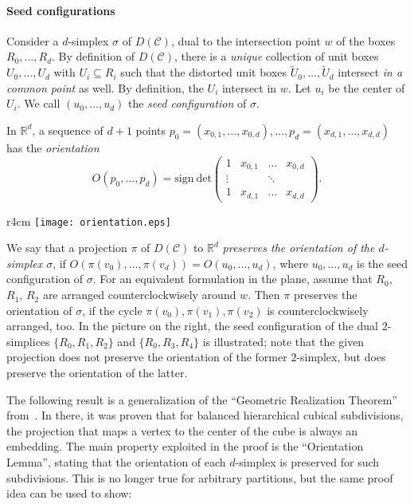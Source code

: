\documentclass[12pt]{article}
\newcommand{\R}{\mathbb{R}}
\newcommand{\orient}{O}
\newcommand{\partition}{\mathcal{C}}
\begin{document}
\paragraph{Seed configurations}
Consider a $d$-simplex $\sigma$ of $D(\partition)$, dual to the intersection point $w$
of the boxes $R_0,\ldots,R_d$.
By definition of $D(\partition)$, there is a \emph{unique} collection of unit boxes
$U_0,\ldots,U_d$ with $U_i\subseteq R_i$ such that the distorted
unit boxes $\tilde{U}_0,\ldots,\tilde{U}_d$ intersect \emph{in a common point} as well.
By definition, the $U_i$ intersect in $w$.
Let $u_i$ be the center of $U_i$. We call $(u_0,\ldots,u_d)$
the \emph{seed configuration} of $\sigma$.

In $\R^d$, a sequence of $d+1$ points
$p_0=(x_{0,1},\ldots,x_{0,d}),\ldots,p_d=(x_{d,1},\ldots,x_{d,d})$ 
has the \emph{orientation} 
\[
\orient(p_0,\ldots,p_d)=\mathrm{sign}\ \mathrm{det}
\left(
\begin{array}{cccc}
1 & x_{0,1} & \ldots & x_{0,d}\\
\vdots & & \ddots & \\
1 & x_{d,1} & \ldots & x_{d,d}
\end{array}
\right).
\]
\begin{wrapfigure}[10]{r}{4cm}
\vspace{-0.3cm}
\texttt{[image: orientation.eps]}
\end{wrapfigure}
We say that a projection $\pi$ of $D(\partition)$ to $\R^d$ \emph{preserves the orientation
of the $d$-simplex $\sigma$}, if $\orient(\pi(v_0),\ldots,\pi(v_d))=\orient(u_0,\ldots,u_d)$,
where $u_0,\ldots,u_d$ is the seed configuration of $\sigma$.
For an equivalent formulation in the plane, assume that $R_0$, $R_1$, $R_2$ are arranged 
counterclockwisely
around $w$. Then $\pi$ preserves the orientation of $\sigma$, if the cycle
$\pi(v_0), \pi(v_1), \pi(v_2)$ is counterclockwisely arranged, too.
In the picture on the right, the seed configuration of the dual $2$-simplices 
$\{R_0,R_1,R_2\}$ and $\{R_0,R_3,R_4\}$ is illustrated; note that the given projection
does not preserve the orientation of the former $2$-simplex, but does preserve the orientation of the latter.

The following result is a generalization of the ``Geometric Realization Theorem''
from~\cite{ek-freudenthal}. In there, it was proven that for balanced hierarchical cubical subdivisions,
the projection that maps a vertex to the center of the cube is always an embedding. The main property
exploited in the proof is the ``Orientation Lemma'', stating that the orientation of each $d$-simplex
is preserved for such subdivisions. This is no longer true for arbitrary partitions, but the same
proof idea can be used to show:
\end{document}
